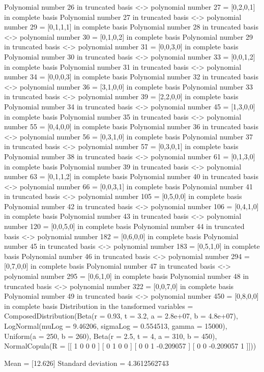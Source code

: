 Polynomial number  26  in truncated basis <-> polynomial number  27  =  [0,2,0,1]  in complete basis
Polynomial number  27  in truncated basis <-> polynomial number  29  =  [0,1,1,1]  in complete basis
Polynomial number  28  in truncated basis <-> polynomial number  30  =  [0,1,0,2]  in complete basis
Polynomial number  29  in truncated basis <-> polynomial number  31  =  [0,0,3,0]  in complete basis
Polynomial number  30  in truncated basis <-> polynomial number  33  =  [0,0,1,2]  in complete basis
Polynomial number  31  in truncated basis <-> polynomial number  34  =  [0,0,0,3]  in complete basis
Polynomial number  32  in truncated basis <-> polynomial number  36  =  [3,1,0,0]  in complete basis
Polynomial number  33  in truncated basis <-> polynomial number  39  =  [2,2,0,0]  in complete basis
Polynomial number  34  in truncated basis <-> polynomial number  45  =  [1,3,0,0]  in complete basis
Polynomial number  35  in truncated basis <-> polynomial number  55  =  [0,4,0,0]  in complete basis
Polynomial number  36  in truncated basis <-> polynomial number  56  =  [0,3,1,0]  in complete basis
Polynomial number  37  in truncated basis <-> polynomial number  57  =  [0,3,0,1]  in complete basis
Polynomial number  38  in truncated basis <-> polynomial number  61  =  [0,1,3,0]  in complete basis
Polynomial number  39  in truncated basis <-> polynomial number  63  =  [0,1,1,2]  in complete basis
Polynomial number  40  in truncated basis <-> polynomial number  66  =  [0,0,3,1]  in complete basis
Polynomial number  41  in truncated basis <-> polynomial number  105  =  [0,5,0,0]  in complete basis
Polynomial number  42  in truncated basis <-> polynomial number  106  =  [0,4,1,0]  in complete basis
Polynomial number  43  in truncated basis <-> polynomial number  120  =  [0,0,5,0]  in complete basis
Polynomial number  44  in truncated basis <-> polynomial number  182  =  [0,6,0,0]  in complete basis
Polynomial number  45  in truncated basis <-> polynomial number  183  =  [0,5,1,0]  in complete basis
Polynomial number  46  in truncated basis <-> polynomial number  294  =  [0,7,0,0]  in complete basis
Polynomial number  47  in truncated basis <-> polynomial number  295  =  [0,6,1,0]  in complete basis
Polynomial number  48  in truncated basis <-> polynomial number  322  =  [0,0,7,0]  in complete basis
Polynomial number  49  in truncated basis <-> polynomial number  450  =  [0,8,0,0]  in complete basis
Distribution in the tansformed variables =  ComposedDistribution(Beta(r = 0.93, t = 3.2, a = 2.8e+07, b = 4.8e+07), LogNormal(muLog = 9.46206, sigmaLog = 0.554513, gamma = 15000), Uniform(a = 250, b = 260), Beta(r = 2.5, t = 4, a = 310, b = 450), NormalCopula(R = [[  1         0         0         0        ]
 [  0         1         0         0        ]
 [  0         0         1        -0.209057 ]
 [  0         0        -0.209057  1        ]]))

Mean = [12.626]
Standard deviation = 4.3612562743

